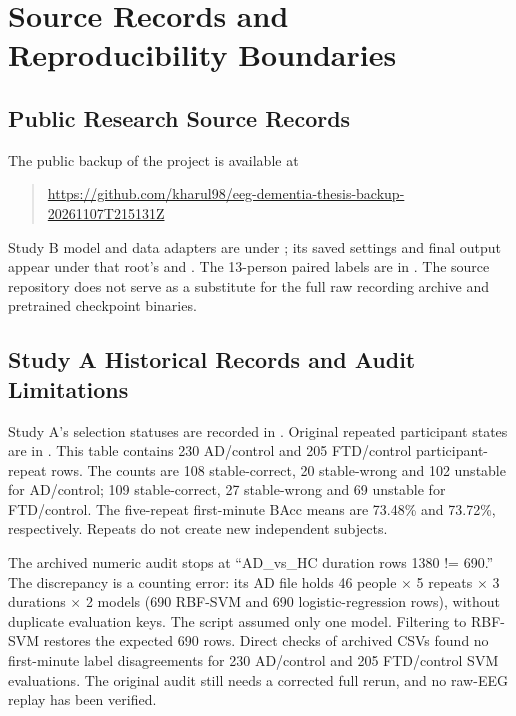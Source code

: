 \chapter{Source Records and Reproducibility Boundaries}
\label{app:sources}
\section{Public Research Source Records}
The public backup of the project is available at
\begin{quote}\small\url{https://github.com/kharul98/eeg-dementia-thesis-backup-20261107T215131Z}\end{quote}
Study B model and data adapters are under ; its saved settings and final output appear under that root's  and . The 13-person paired labels are in . The source repository does not serve as a substitute for the full raw recording archive and pretrained checkpoint binaries.

\section{Study A Historical Records and Audit Limitations}
Study A's selection statuses are recorded in . Original repeated participant states are in . This table contains 230 AD/control and 205 FTD/control participant-repeat rows. The counts are 108 stable-correct, 20 stable-wrong and 102 unstable for AD/control; 109 stable-correct, 27 stable-wrong and 69 unstable for FTD/control. The five-repeat first-minute BAcc means are 73.48\% and 73.72\%, respectively. Repeats do not create new independent subjects.

The archived numeric audit stops at ``AD\_vs\_HC duration rows 1380 != 690.'' The discrepancy is a counting error: its AD file holds 46 people $\times$ 5 repeats $\times$ 3 durations $\times$ 2 models (690 RBF-SVM and 690 logistic-regression rows), without duplicate evaluation keys. The script assumed only one model. Filtering to RBF-SVM restores the expected 690 rows. Direct checks of archived CSVs found no first-minute label disagreements for 230 AD/control and 205 FTD/control SVM evaluations. The original audit still needs a corrected full rerun, and no raw-EEG replay has been verified.

